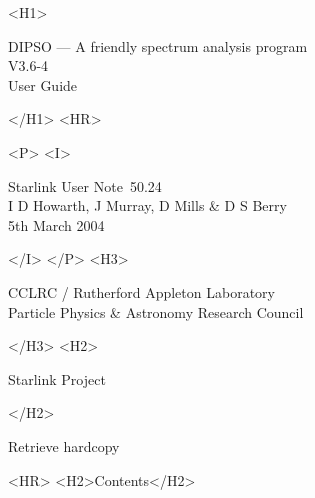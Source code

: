 \documentclass[twoside,11pt]{article}
\newcommand{\stardoccategory}  {Starlink User Note}
\newcommand{\stardocsource}    {sun\stardocnumber}
\newcommand{\stardocnumber} {50.24}
\newcommand{\stardocauthors} {I D Howarth, J Murray, D Mills \& D S Berry}
\newcommand{\stardocdate} {5th March 2004}
\newcommand{\stardoctitle} {DIPSO --- A friendly spectrum analysis program}
\newcommand{\stardocversion}   {V3.6-4}
\newcommand{\stardocmanual}    {User Guide}
\newcommand{\htmladdnormallink}[2]{#1}
\newcommand{\htmladdimg}[1]{}
\newcommand{\htmlref}[2]{#1}
\newcommand{\htmladdtonavigation}[1]{}
\newcommand{\xlabel}[1]{}
\renewcommand{\_}{\texttt{\symbol{95}}}
\begin{document}
\begin{htmlonly}
   \xlabel{}
   \begin{rawhtml} <H1> \end{rawhtml}
      \stardoctitle\\
      \stardocversion\\
      \stardocmanual
   \begin{rawhtml} </H1> <HR> \end{rawhtml}


   \begin{rawhtml} <P> <I> \end{rawhtml}
   \stardoccategory\ \stardocnumber \\
   \stardocauthors \\
   \stardocdate
   \begin{rawhtml} </I> </P> <H3> \end{rawhtml}
      \htmladdnormallink{CCLRC / Rutherford Appleton Laboratory}
                        {http://www.cclrc.ac.uk} \\
      \htmladdnormallink{Particle Physics \& Astronomy Research Council}
                        {http://www.pparc.ac.uk} \\
   \begin{rawhtml} </H3> <H2> \end{rawhtml}
      \htmladdnormallink{Starlink Project}{http://www.starlink.rl.ac.uk/}
   \begin{rawhtml} </H2> \end{rawhtml}
   \htmladdnormallink{\htmladdimg{source.gif} Retrieve hardcopy}
      {http://www.starlink.rl.ac.uk/cgi-bin/hcserver?\stardocsource}\\

  \label{stardoccontents}
  \begin{rawhtml} 
    <HR>
    <H2>Contents</H2>
  \end{rawhtml}
  \htmladdtonavigation{\htmlref{\htmladdimg{contents_motif.gif}}
        {stardoccontents}}

\end{htmlonly}
\end{document}
